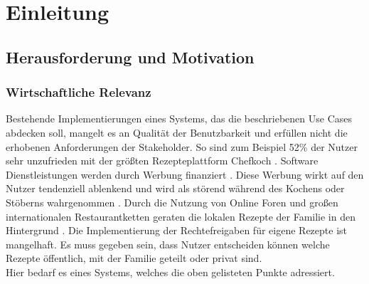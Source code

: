 \chapter{Einleitung}
\label{cha:Einleitung}

\section{Herausforderung und Motivation}
\subsection{Wirtschaftliche Relevanz}
Bestehende Implementierungen eines Systems, das die beschriebenen Use Cases abdecken soll, mangelt es an Qualität der Benutzbarkeit und erfüllen nicht die erhobenen Anforderungen der Stakeholder. So sind zum Beispiel 52\% der Nutzer sehr unzufrieden mit der größten Rezepteplattform Chefkoch \citep{trustpilot:online}. Software Dienstleistungen werden durch Werbung finanziert \citep[vgl. Punkt 1]{HowDoFre38:online}. Diese Werbung wirkt auf den Nutzer tendenziell ablenkend und wird als störend während des Kochens oder Stöberns wahrgenommen \citep{Allesvol19:online}. Durch die Nutzung von Online Foren und großen internationalen Restaurantketten geraten die lokalen Rezepte der Familie in den Hintergrund \citep{bpb2021fastfood, bpb2021fastfoodtopic, HowHasGl49:online}. Die Implementierung der Rechtefreigaben für eigene Rezepte ist mangelhaft. Es muss gegeben sein, dass Nutzer entscheiden können welche Rezepte öffentlich, mit der Familie geteilt oder privat sind.\\
Hier bedarf es eines Systems, welches die oben gelisteten Punkte adressiert. 

